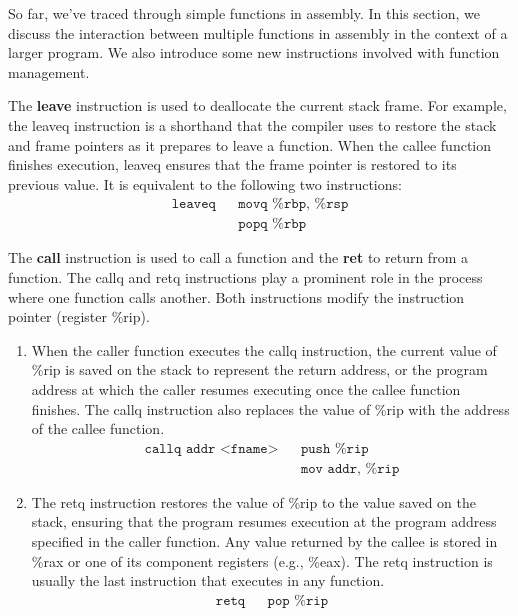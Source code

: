   So far, we've traced through simple functions in assembly. In this section, we discuss the interaction between multiple functions in assembly in the context of a larger program. We also introduce some new instructions involved with function management. 

  \begin{definition}[Leave]
    The \textbf{leave} instruction is used to deallocate the current stack frame. For example, the leaveq instruction is a shorthand that the compiler uses to restore the stack and frame pointers as it prepares to leave a function. When the callee function finishes execution, leaveq ensures that the frame pointer is restored to its previous value. It is equivalent to the following two instructions: 
    \begin{align*}
      \texttt{leaveq} && \texttt{movq \%rbp, \%rsp} \\
                      && \texttt{popq \%rbp}
    \end{align*}
  \end{definition}

  \begin{definition}
    The \textbf{call} instruction is used to call a function and the \textbf{ret} to return from a function. The callq and retq instructions play a prominent role in the process where one function calls another. Both instructions modify the instruction pointer (register \%rip). 

    \begin{enumerate}
      \item When the caller function executes the callq instruction, the current value of \%rip is saved on the stack to represent the return address, or the program address at which the caller resumes executing once the callee function finishes. The callq instruction also replaces the value of \%rip with the address of the callee function. 
        \begin{align*}
          \texttt{callq addr <fname>} && \texttt{push \%rip} \\
                                      && \texttt{mov addr, \%rip}
        \end{align*}
      \item The retq instruction restores the value of \%rip to the value saved on the stack, ensuring that the program resumes execution at the program address specified in the caller function. Any value returned by the callee is stored in \%rax or one of its component registers (e.g., \%eax). The retq instruction is usually the last instruction that executes in any function.
        \begin{align*}
          \texttt{retq} && \texttt{pop \%rip} \\
        \end{align*}
    \end{enumerate}
  \end{definition}

